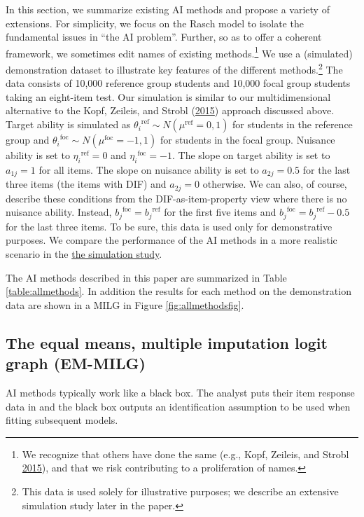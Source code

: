 \documentclass[
  11pt,
]{article}
\begin{document}
In this section, we summarize existing AI methods and propose a variety of extensions. For simplicity, we focus on the Rasch model to isolate the fundamental issues in \enquote{the AI problem}. Further, so as to offer a coherent framework, we sometimes edit names of existing methods.\footnote{We recognize that others have done the same (e.g., Kopf, Zeileis, and Strobl \protect\hyperlink{ref-kopf2015framework}{2015}), and that we risk contributing to a proliferation of names.} We use a (simulated) demonstration dataset to illustrate key features of the different methods.\footnote{This data is used solely for illustrative purposes; we describe an extensive simulation study later in the paper.} The data consists of 10,000 reference group students and 10,000 focal group students taking an eight-item test. Our simulation is similar to our multidimensional alternative to the Kopf, Zeileis, and Strobl (\protect\hyperlink{ref-kopf2015framework}{2015}) approach discussed above. Target ability is simulated as \({\theta_i}^{\text{ref}} \sim N(\mu^\text{ref} = 0,1)\) for students in the reference group and \({\theta_i}^{\text{foc}} \sim N(\mu^\text{foc} = -1,1)\) for students in the focal group. Nuisance ability is set to \({\eta_i}^{\text{ref}} = 0\) and \({\eta_i}^{\text{foc}} = -1\). The slope on target ability is set to \(a_{1j} = 1\) for all items. The slope on nuisance ability is set to \(a_{2j} = 0.5\) for the last three items (the items with DIF) and \(a_{2j} = 0\) otherwise. We can also, of course, describe these conditions from the DIF-as-item-property view where there is no nuisance ability. Instead, \({b_j}^{\text{foc}} = {b_j}^{\text{ref}}\) for the first five items and \({b_j}^{\text{foc}} = {b_j}^{\text{ref}} - 0.5\) for the last three items. To be sure, this data is used only for demonstrative purposes. We compare the performance of the AI methods in a more realistic scenario in the \protect\hyperlink{simstudy}{the simulation study}.

The AI methods described in this paper are summarized in Table \ref{table:allmethods}. In addition the results for each method on the demonstration data are shown in a MILG in Figure \ref{fig:allmethodsfig}.

\hypertarget{emmilg}{%
\subsection{The equal means, multiple imputation logit graph (EM-MILG)}\label{emmilg}}

AI methods typically work like a black box. The analyst puts their item response data in and the black box outputs an identification assumption to be used when fitting subsequent models.
\end{document}
